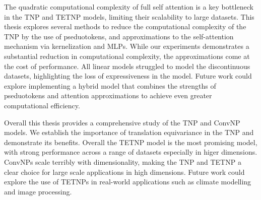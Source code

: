 \documentclass[../../main.tex]{subfiles}
\begin{document}
The quadratic computational complexity of full self attention is a key bottleneck in the TNP and TETNP models, limiting their scalability to large datasets. This thesis explores several methods to reduce the computational complexity of the TNP by the use of pseduotokens, and approximations to the self-attention mechanism via kernelization and MLPs. While our experiments demonstrates a substantial reduction in computational complexity, the approximations come at the cost of performance. All linear models struggled to model the discontinuous datasets, highlighting the loss of expressiveness in the model. Future work could explore implementing a hybrid model that combines the strengths of pseduotokens and attention approximations to achieve even greater computational efficiency. 

Overall this thesis provides a comprehensive study of the TNP and ConvNP models. We establish the importance of translation equivariance in the TNP and demonstrate its benefits. Overall the TETNP model is the most promising model, with strong performance across a range of datasets especially in higer dimensions. ConvNPs scale terribly with dimensionality, making the TNP and TETNP a clear choice for large scale applications in high dimensions. Future work could explore the use of TETNPs in real-world applications such as climate modelling and image processing.
\end{document}
